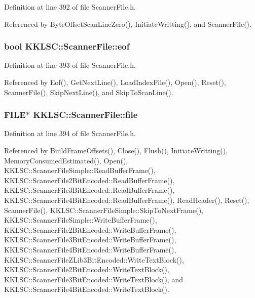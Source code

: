 Definition at line 392 of file Scanner\+File.\+h.



Referenced by Byte\+Offset\+Scan\+Line\+Zero(), Initiate\+Writting(), and Scanner\+File().

\subsubsection[{\texorpdfstring{eof}{eof}}]{\setlength{\rightskip}{0pt plus 5cm}bool K\+K\+L\+S\+C\+::\+Scanner\+File\+::eof\hspace{0.3cm}{\ttfamily [protected]}}\hypertarget{class_k_k_l_s_c_1_1_scanner_file_aab1ab73f86c83384609406accceac88f}{}\label{class_k_k_l_s_c_1_1_scanner_file_aab1ab73f86c83384609406accceac88f}


Definition at line 393 of file Scanner\+File.\+h.



Referenced by Eof(), Get\+Next\+Line(), Load\+Index\+File(), Open(), Reset(), Scanner\+File(), Skip\+Next\+Line(), and Skip\+To\+Scan\+Line().

\subsubsection[{\texorpdfstring{file}{file}}]{\setlength{\rightskip}{0pt plus 5cm}F\+I\+LE$\ast$ K\+K\+L\+S\+C\+::\+Scanner\+File\+::file\hspace{0.3cm}{\ttfamily [protected]}}\hypertarget{class_k_k_l_s_c_1_1_scanner_file_a26db15f7823ce67b1621da17468ec807}{}\label{class_k_k_l_s_c_1_1_scanner_file_a26db15f7823ce67b1621da17468ec807}


Definition at line 394 of file Scanner\+File.\+h.



Referenced by Build\+Frame\+Offsets(), Close(), Flush(), Initiate\+Writting(), Memory\+Consumed\+Estimated(), Open(), K\+K\+L\+S\+C\+::\+Scanner\+File\+Simple\+::\+Read\+Buffer\+Frame(), K\+K\+L\+S\+C\+::\+Scanner\+File2\+Bit\+Encoded\+::\+Read\+Buffer\+Frame(), K\+K\+L\+S\+C\+::\+Scanner\+File3\+Bit\+Encoded\+::\+Read\+Buffer\+Frame(), K\+K\+L\+S\+C\+::\+Scanner\+File4\+Bit\+Encoded\+::\+Read\+Buffer\+Frame(), Read\+Header(), Reset(), Scanner\+File(), K\+K\+L\+S\+C\+::\+Scanner\+File\+Simple\+::\+Skip\+To\+Next\+Frame(), K\+K\+L\+S\+C\+::\+Scanner\+File\+Simple\+::\+Write\+Buffer\+Frame(), K\+K\+L\+S\+C\+::\+Scanner\+File2\+Bit\+Encoded\+::\+Write\+Buffer\+Frame(), K\+K\+L\+S\+C\+::\+Scanner\+File3\+Bit\+Encoded\+::\+Write\+Buffer\+Frame(), K\+K\+L\+S\+C\+::\+Scanner\+File4\+Bit\+Encoded\+::\+Write\+Buffer\+Frame(), K\+K\+L\+S\+C\+::\+Scanner\+File\+Z\+Lib3\+Bit\+Encoded\+::\+Write\+Text\+Block(), K\+K\+L\+S\+C\+::\+Scanner\+File2\+Bit\+Encoded\+::\+Write\+Text\+Block(), K\+K\+L\+S\+C\+::\+Scanner\+File3\+Bit\+Encoded\+::\+Write\+Text\+Block(), and K\+K\+L\+S\+C\+::\+Scanner\+File4\+Bit\+Encoded\+::\+Write\+Text\+Block().

